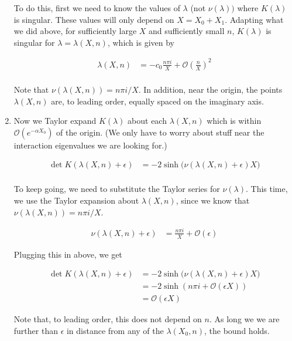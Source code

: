 \documentclass[12pt]{article}
\begin{document}
\begin{enumerate}
To do this, first we need to know the values of $\lambda$ (not $\nu(\lambda))$ where $K(\lambda)$ is singular. These values will only depend on $X = X_0 + X_1$. Adapting what we did above, for sufficiently large $X$ and sufficiently small $n$, $K(\lambda)$ is singular for $\lambda = \lambda(X, n)$, which is given by

\begin{align*}
\lambda(X, n)
&= -c_0 \frac{n \pi i }{X} + \mathcal{O}\left( \frac{n}{X}\right)^2 \\
\end{align*}

Note that $\nu(\lambda(X, n)) = n \pi i/X$. In addition, near the origin, the points $\lambda(X, n)$ are, to leading order, equally spaced on the imaginary axis.

\item Now we Taylor expand $K(\lambda)$ about each $\lambda(X, n)$ which is within $\mathcal{O}(e^{-\alpha X_0})$ of the origin. (We only have to worry about stuff near the interaction eigenvalues we are looking for.)

\begin{align*}
\det K( \lambda(X, n) + \epsilon )
&= -2 \sinh \Big( \nu(\lambda(X, n) + \epsilon )X \Big) \\
\end{align*}

To keep going, we need to substitute the Taylor series for $\nu(\lambda)$. This time, we use the Taylor expansion about $\lambda(X, n)$, since we know that $\nu( \lambda(X, n) ) = n \pi i / X$.

\begin{align*}
\nu(\lambda(X, n) + \epsilon ) &= 
\frac{n \pi i }{X} + \mathcal{O}(\epsilon)
\end{align*}

Plugging this in above, we get

\begin{align*}
\det K( \lambda(X, n) + \epsilon )
&= -2 \sinh \Big( \nu(\lambda(X, n) + \epsilon )X \Big) \\
&= -2 \sinh \left( n \pi i + \mathcal{O}(\epsilon X) \right) \\
&= \mathcal{O}(\epsilon X )
\end{align*}

Note that, to leading order, this does not depend on $n$. As long we we are further than $\epsilon$ in distance from any of the $\lambda(X_0, n)$, the bound holds.\\


\end{enumerate}
\end{document}
